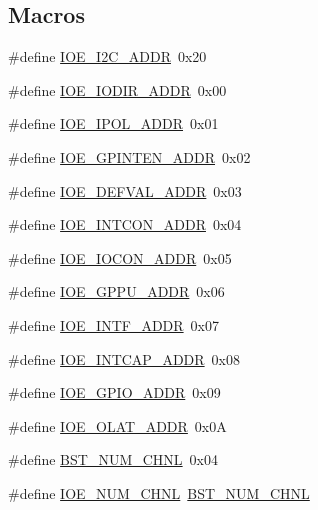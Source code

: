 \subsection*{Macros}
\begin{DoxyCompactItemize}
\item 
\#define \hyperlink{a00007_ad615a329bea187ce779cf9930ba8a6fa}{I\-O\-E\-\_\-\-I2\-C\-\_\-\-A\-D\-D\-R}~0x20
\item 
\#define \hyperlink{a00007_a36c134b088cc2e64e0a5e14e8f90fe38}{I\-O\-E\-\_\-\-I\-O\-D\-I\-R\-\_\-\-A\-D\-D\-R}~0x00
\item 
\#define \hyperlink{a00007_a04633cd2ea7fd0b332e1edf066f674c4}{I\-O\-E\-\_\-\-I\-P\-O\-L\-\_\-\-A\-D\-D\-R}~0x01
\item 
\#define \hyperlink{a00007_aa68be5a6ed28fb146600b4fd2d11fafd}{I\-O\-E\-\_\-\-G\-P\-I\-N\-T\-E\-N\-\_\-\-A\-D\-D\-R}~0x02
\item 
\#define \hyperlink{a00007_a687e15212e8d4b49c12159dce73eeeab}{I\-O\-E\-\_\-\-D\-E\-F\-V\-A\-L\-\_\-\-A\-D\-D\-R}~0x03
\item 
\#define \hyperlink{a00007_a90945d9544eebc892154f1e0443b1407}{I\-O\-E\-\_\-\-I\-N\-T\-C\-O\-N\-\_\-\-A\-D\-D\-R}~0x04
\item 
\#define \hyperlink{a00007_af44ed2bf93808aeb932ce9944a942b75}{I\-O\-E\-\_\-\-I\-O\-C\-O\-N\-\_\-\-A\-D\-D\-R}~0x05
\item 
\#define \hyperlink{a00007_a91e588d697383f94de2bf7f11d9ecb4b}{I\-O\-E\-\_\-\-G\-P\-P\-U\-\_\-\-A\-D\-D\-R}~0x06
\item 
\#define \hyperlink{a00007_a32cac2ad5af58a2562540ec8fc205dd1}{I\-O\-E\-\_\-\-I\-N\-T\-F\-\_\-\-A\-D\-D\-R}~0x07
\item 
\#define \hyperlink{a00007_ac0afd8503a8584599cc81f3d9b0a04dc}{I\-O\-E\-\_\-\-I\-N\-T\-C\-A\-P\-\_\-\-A\-D\-D\-R}~0x08
\item 
\#define \hyperlink{a00007_af2d85152c5775a221f107d6de547bca1}{I\-O\-E\-\_\-\-G\-P\-I\-O\-\_\-\-A\-D\-D\-R}~0x09
\item 
\#define \hyperlink{a00007_ab26864d7372ac11db9c1996842a3cf56}{I\-O\-E\-\_\-\-O\-L\-A\-T\-\_\-\-A\-D\-D\-R}~0x0\-A
\item 
\#define \hyperlink{a00007_ac36a77a8d07d8025000e3e748cea40dd}{B\-S\-T\-\_\-\-N\-U\-M\-\_\-\-C\-H\-N\-L}~0x04
\item 
\#define \hyperlink{a00007_a5b329f52cf0129bf56d1b16eb706dee4}{I\-O\-E\-\_\-\-N\-U\-M\-\_\-\-C\-H\-N\-L}~\hyperlink{a00007_ac36a77a8d07d8025000e3e748cea40dd}{B\-S\-T\-\_\-\-N\-U\-M\-\_\-\-C\-H\-N\-L}
\end{DoxyCompactItemize}
